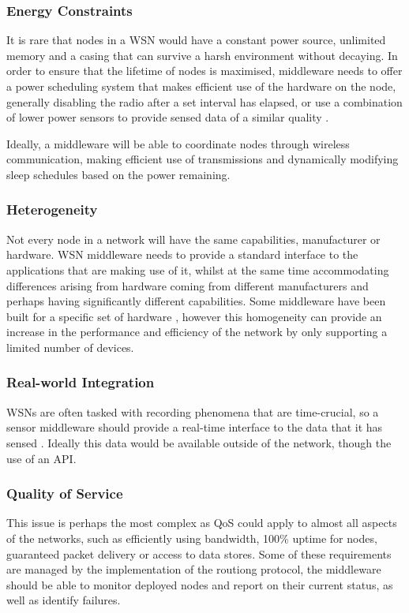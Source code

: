 	\subsubsection{Energy Constraints}
		It is rare that nodes in a WSN would have a constant power source, unlimited memory and a casing that can survive a harsh environment without decaying. In order to ensure that the lifetime of nodes is maximised, middleware needs to offer a power scheduling system that makes efficient use of the hardware on the node, generally disabling the radio after a set interval has elapsed, or use a combination of lower power sensors to provide sensed data of a similar quality \cite{Heinzelman2004}.

		Ideally, a middleware will be able to coordinate nodes through wireless communication, making efficient use of transmissions and dynamically modifying sleep schedules based on the power remaining.
	\subsubsection{Heterogeneity}
		Not every node in a network will have the same capabilities, manufacturer or hardware. WSN middleware needs to provide a standard interface to the applications that are making use of it, whilst at the same time accommodating differences arising from hardware coming from different manufacturers and perhaps having significantly different capabilities. Some middleware have been built for a specific set of hardware \cite{Tengg2007}, however this homogeneity can provide an increase in the performance and efficiency of the network by only supporting a limited number of devices.
	\subsubsection{Real-world Integration}
		WSNs are often tasked with recording phenomena that are time-crucial, so a sensor middleware should provide a real-time interface to the data that it has sensed \cite{F2006}. Ideally this data would be available outside of the network, though the use of an API.
	\subsubsection{Quality of Service}
		This issue is perhaps the most complex as QoS could apply to almost all aspects of the networks, such as efficiently using bandwidth, 100\% uptime for nodes, guaranteed packet delivery or access to data stores. Some of these requirements are managed by the implementation of the routiong protocol, the middleware should be able to monitor deployed nodes and report on their current status, as well as identify failures.

